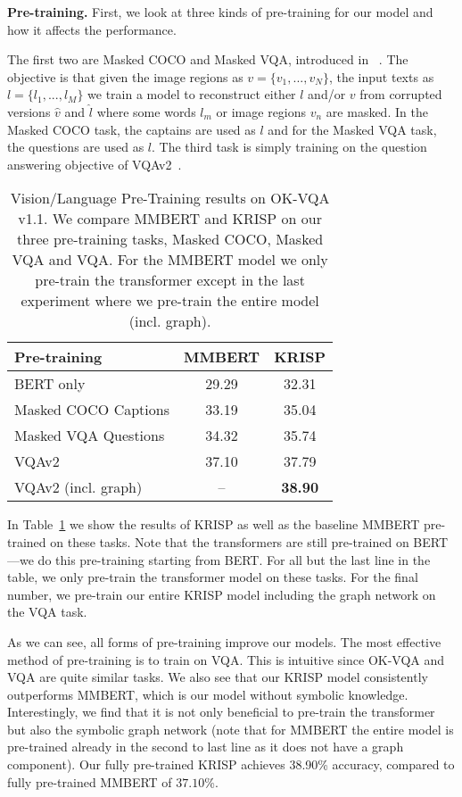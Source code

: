 \documentclass[final]{cvpr}
\providecommand{\ModelName}{KRISP\xspace}
\providecommand{\MMBERTAbr}{MMBERT\xspace}
\providecommand{\myparagraph}[1]{\noindent\textbf{#1.}}
\begin{document}
\myparagraph{Pre-training}
First, we look at three kinds of pre-training for our model and how it affects the performance.

The first two are Masked COCO and Masked VQA, introduced in ~\cite{singh2020we}. The objective is that given the image regions as $v = \{v_1, ..., v_N \}$, the input texts as $l = \{l_1, ..., l_M\}$ we train a model to reconstruct either $l$ and/or $v$ from corrupted versions $\hat{v}$ and $\hat{l}$ where some words
$l_m$ or image regions $v_n$ are masked. In the Masked COCO task, the captains are used as $l$ and for the Masked VQA task, the questions are used as $l$. The third task is simply training on the question answering objective of VQAv2~\cite{goyal2017making}.

\begin{table}[t]
\begin{center}
\begin{tabular}{@{}lcc@{}}
\toprule
Pre-training & \MMBERTAbr & \ModelName \\ \midrule
BERT only & 29.29  & 32.31 \\
Masked COCO Captions  & 33.19 & 35.04\\
Masked VQA Questions  & 34.32  & 35.74\\
VQAv2 & 37.10  & 37.79\\
VQAv2 (incl. graph)  & -- & \textbf{38.90}\\
\bottomrule
\end{tabular}
\end{center}
\caption{Vision/Language Pre-Training results on OK-VQA v1.1. We compare \MMBERTAbr and \ModelName on our three pre-training tasks, Masked COCO, Masked VQA and VQA. For the \MMBERTAbr model we only pre-train the transformer except in the last experiment where we pre-train the entire model (incl. graph).}
\label{table:Pretrain}
\vspace{-.3cm}
\end{table}

In Table~\ref{table:Pretrain} we show the results of \ModelName as well as the baseline \MMBERTAbr pre-trained on these tasks. Note that the transformers are still pre-trained on BERT---we do this pre-training starting from BERT. For all but the last line in the table, we only pre-train the transformer model on these tasks. For the final number, we pre-train our entire \ModelName model including the graph network on the VQA task.

As we can see, all forms of pre-training improve our models. The most effective method of pre-training is to train on VQA. This is intuitive since OK-VQA and VQA are quite similar tasks. We also see that our \ModelName model consistently outperforms \MMBERTAbr, which is our model without symbolic knowledge. 
Interestingly, we find that it is not only beneficial to pre-train the transformer but also the symbolic graph network (note that for \MMBERTAbr the entire model is pre-trained already in the second to last line as it does not have a graph component). Our fully pre-trained \ModelName achieves 38.90\% accuracy, compared to fully pre-trained \MMBERTAbr of $37.10$\%. 
\end{document}
